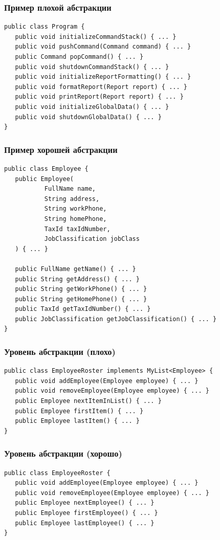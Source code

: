 \documentclass[xetex,mathserif,serif]{beamer}
\begin{document}
	\begin{frame}[fragile]
		\frametitle{Пример плохой абстракции}
		\begin{verbatim}
public class Program {
   public void initializeCommandStack() { ... }
   public void pushCommand(Command command) { ... }
   public Command popCommand() { ... }
   public void shutdownCommandStack() { ... }
   public void initializeReportFormatting() { ... }
   public void formatReport(Report report) { ... }
   public void printReport(Report report) { ... }
   public void initializeGlobalData() { ... }
   public void shutdownGlobalData() { ... }
}
		\end{verbatim}
\end{frame}

	\begin{frame}[fragile]
		\frametitle{Пример хорошей абстракции}
		\begin{footnotesize}
			\begin{verbatim}
public class Employee {
   public Employee(
           FullName name,
           String address,
           String workPhone,
           String homePhone,
           TaxId taxIdNumber,
           JobClassification jobClass
   ) { ... }

   public FullName getName() { ... }
   public String getAddress() { ... }
   public String getWorkPhone() { ... }
   public String getHomePhone() { ... }
   public TaxId getTaxIdNumber() { ... }
   public JobClassification getJobClassification() { ... }
}
			\end{verbatim}
		\end{footnotesize}
\end{frame}

	\begin{frame}[fragile]
		\frametitle{Уровень абстракции (плохо)}
		\begin{verbatim}
public class EmployeeRoster implements MyList<Employee> {
   public void addEmployee(Employee employee) { ... }
   public void removeEmployee(Employee employee) { ... }
   public Employee nextItemInList() { ... }
   public Employee firstItem() { ... }
   public Employee lastItem() { ... }
}
		\end{verbatim}
\end{frame}

	\begin{frame}[fragile]
		\frametitle{Уровень абстракции (хорошо)}
		\begin{verbatim}
public class EmployeeRoster {
   public void addEmployee(Employee employee) { ... }
   public void removeEmployee(Employee employee) { ... }
   public Employee nextEmployee() { ... }
   public Employee firstEmployee() { ... }
   public Employee lastEmployee() { ... }
}
		\end{verbatim}
\end{frame}
\end{document}
